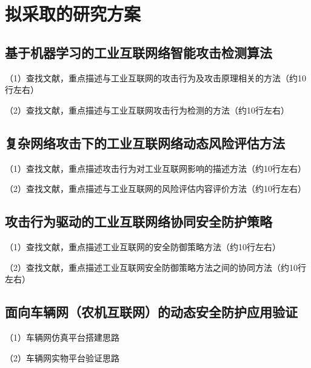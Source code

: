 \section{拟采取的研究方案}

\subsection{基于机器学习的工业互联网络智能攻击检测算法}

（1）查找文献，重点描述与工业互联网的攻击行为及攻击原理相关的方法（约10行左右）

（2）查找文献，重点描述与工业互联网攻击行为检测的方法（约10行左右）

\subsection{复杂网络攻击下的工业互联网络动态风险评估方法}

（1）查找文献，重点描述攻击行为对工业互联网影响的描述方法（约10行左右）

（2）查找文献，重点描述与工业互联网的风险评估内容评价方法（约10行左右）

\subsection{攻击行为驱动的工业互联网络协同安全防护策略}

（1）查找文献，重点描述工业互联网的安全防御策略方法（约10行左右）

（2）查找文献，重点描述工业互联网安全防御策略方法之间的协同方法（约10行左右）

\subsection{面向车辆网（农机互联网）的动态安全防护应用验证}

（1）车辆网仿真平台搭建思路

（2）车辆网实物平台验证思路